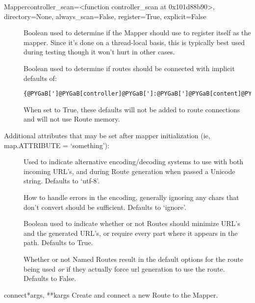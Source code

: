 \documentclass[letterpaper,10pt,english]{manual}
\begin{document}
\begin{classdesc}{Mapper}{controller\_scan=\textless{}function controller\_scan at 0x101d88b90\textgreater{}, directory=None, always\_scan=False, register=True, explicit=False}
\begin{description}
\item[]
Boolean used to determine if the Mapper should use 
 to register itself as the mapper. Since
it's done on a thread-local basis, this is typically best
used during testing though it won't hurt in other cases.

\item[]
Boolean used to determine if routes should be connected
with implicit defaults of:

\begin{Verbatim}[commandchars=@\[\]]
{@PYGaB[']@PYGaB[controller]@PYGaB[']:@PYGaB[']@PYGaB[content]@PYGaB['],@PYGaB[']@PYGaB[action]@PYGaB[']:@PYGaB[']@PYGaB[index]@PYGaB['],@PYGaB[']@PYGaB[id]@PYGaB[']:@PYGaA[None]}
\end{Verbatim}

When set to True, these defaults will not be added to route
connections and  will not use Route memory.

\end{description}

Additional attributes that may be set after mapper
initialization (ie, map.ATTRIBUTE = `something'):
\begin{description}
\item[]
Used to indicate alternative encoding/decoding systems to
use with both incoming URL's, and during Route generation
when passed a Unicode string. Defaults to `utf-8'.

\item[]
How to handle errors in the encoding, generally ignoring
any chars that don't convert should be sufficient. Defaults
to `ignore'.

\item[]
Boolean used to indicate whether or not Routes should
minimize URL's and the generated URL's, or require every
part where it appears in the path. Defaults to True.

\item[]
Whether or not Named Routes result in the default options
for the route being used \emph{or} if they actually force url
generation to use the route. Defaults to False.

\end{description}

\hypertarget{routes.Mapper.connect}{}\begin{methoddesc}{connect}{*args, **kargs}
Create and connect a new Route to the Mapper.


\end{methoddesc}
\end{classdesc}
\end{document}
